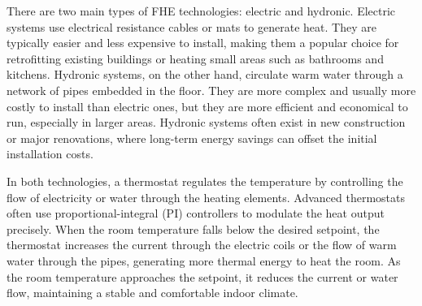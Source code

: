 \documentclass[../main.tex]{subfiles}
\begin{document}
There are two main types of FHE technologies: electric and hydronic. Electric systems use electrical resistance cables or mats to generate heat. They are typically easier and less expensive to install, making them a popular choice for retrofitting existing buildings or heating small areas such as bathrooms and kitchens. Hydronic systems, on the other hand, circulate warm water through a network of pipes embedded in the floor. They are more complex and usually more costly to install than electric ones, but they are more efficient and economical to run, especially in larger areas. Hydronic systems often exist in new construction or major renovations, where long-term energy savings can offset the initial installation costs.

In both technologies, a thermostat regulates the temperature by controlling the flow of electricity or water through the heating elements. Advanced thermostats often use proportional-integral (PI) controllers to modulate the heat output precisely. When the room temperature falls below the desired setpoint, the thermostat increases the current through the electric coils or the flow of warm water through the pipes, generating more thermal energy to heat the room. As the room temperature approaches the setpoint, it reduces the current or water flow, maintaining a stable and comfortable indoor climate.

\end{document}

